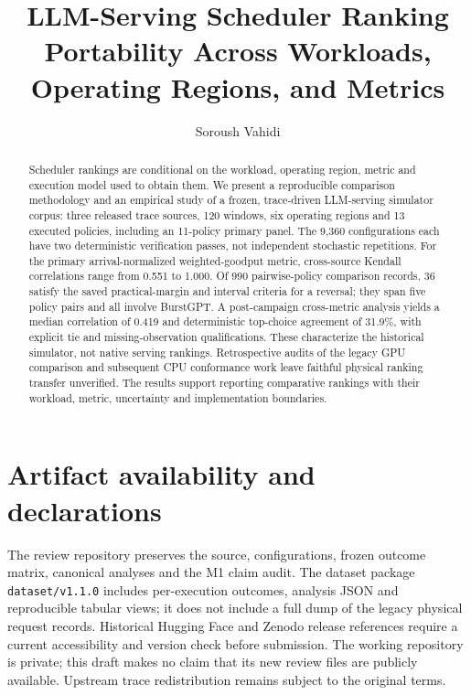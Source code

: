 \documentclass[acmsmall,screen]{acmart}
\title{LLM-Serving Scheduler Ranking Portability Across Workloads, Operating Regions, and Metrics}
\author{Soroush Vahidi}
\affiliation{\institution{New Jersey Institute of Technology}\city{Newark}\state{New Jersey}\country{USA}}
\begin{document}
\begin{abstract}
Scheduler rankings are conditional on the workload, operating region,
metric and execution model used to obtain them. We present a reproducible
comparison methodology and an empirical study of a frozen, trace-driven
LLM-serving simulator corpus: three released trace sources, 120 windows,
six operating regions and 13 executed policies, including an 11-policy
primary panel. The 9,360 configurations each have two deterministic
verification passes, not independent stochastic repetitions. For the
primary arrival-normalized weighted-goodput metric, cross-source Kendall
correlations range from 0.551 to 1.000. Of 990 pairwise-policy comparison
records, 36 satisfy the saved practical-margin and interval criteria for
a reversal; they span five policy pairs and all involve BurstGPT.
A post-campaign cross-metric analysis yields a median correlation of 0.419
and deterministic top-choice agreement of 31.9\%, with explicit tie and
missing-observation qualifications. These characterize the historical
simulator, not native serving rankings. Retrospective audits of the legacy
GPU comparison and subsequent CPU conformance work leave faithful physical
ranking transfer unverified. The results support reporting comparative
rankings with their workload, metric, uncertainty and implementation boundaries.
\end{abstract}
\maketitle











\section*{Artifact availability and declarations}\label{sec:artifact}
The review repository preserves the source, configurations, frozen outcome
matrix, canonical analyses and the M1 claim audit. The dataset package
\texttt{dataset/v1.1.0} includes per-execution outcomes, analysis JSON and
reproducible tabular views; it does not include a full dump of the legacy
physical request records. Historical Hugging Face and Zenodo release
references require a current accessibility and version check before submission.
The working repository is private; this draft makes no claim that its new
review files are publicly available. Upstream trace redistribution remains
subject to the original terms.
\end{document}
